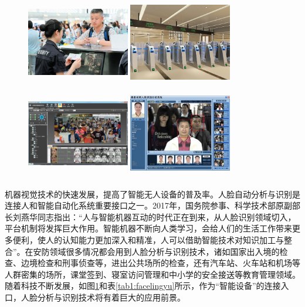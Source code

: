 \begin{figure}[htbp] 
  \centering 
\includegraphics[height=4cm,width=0.4\textwidth]{fig//1-1-a.jpg} 
\includegraphics[height=4cm,width=0.4\textwidth]{fig//1-1-b.jpg} 
\includegraphics[height=4cm,width=0.4\textwidth]{fig//1-1-c.jpg} 
\includegraphics[height=4cm,width=0.4\textwidth]{fig//1-1-d.jpg}  
\label{fig1:ND} 
\end{figure}

机器视觉技术的快速发展，提高了智能无人设备的普及率。人脸自动分析与识别是连接人和智能自动化系统重要接口之一。2017年，国务院参事、科学技术部原副部长刘燕华同志指出：“人与智能机器互动的时代正在到来，从人脸识别领域切入，平台机制将发挥巨大作用。智能机器不断向人类学习，会给人们的生活工作带来更多便利，使人的认知能力更加深入和精准，人可以借助智能技术对知识加工与整合”\cite{liu2013}。在安防领域很多情况都会用到人脸分析与识别技术，诸如国家出入境的检查、边境检查和刑事侦查等，进出公共场所的检查，还有汽车站、火车站和机场等人群密集的场所，课堂签到、寝室访问管理和中小学的安全接送等教育管理领域。随着科技不断发展，如图\ref{fig1:ND}和表\ref{tab1:facelingyu}所示，作为“智能设备”的连接入口，人脸分析与识别技术将有着巨大的应用前景。

